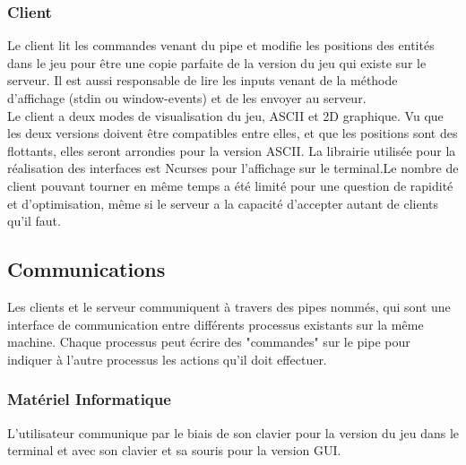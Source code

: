 \documentclass[french]{article}
\begin{document}
\subsubsection{Client} 
Le client lit les commandes venant du pipe et modifie les positions des entités dans le jeu pour être une copie parfaite de la version du jeu qui existe sur le serveur. Il est aussi responsable de lire les inputs venant de la méthode d'affichage (stdin ou window-events) et de les envoyer au serveur.\\
Le client a deux modes de visualisation du jeu, ASCII et 2D graphique. Vu que les deux versions doivent être compatibles entre elles, et que les positions sont des flottants, elles seront arrondies pour la version ASCII. La librairie utilisée pour la réalisation des interfaces est Ncurses pour l'affichage sur le terminal.Le nombre de client pouvant tourner en même temps a été limité pour une question de rapidité et d'optimisation, même si le serveur a la capacité d'accepter autant de clients qu'il faut.
\subsection{Communications}
Les clients et le serveur communiquent à travers des pipes nommés, qui sont une interface de communication entre différents processus existants sur la même machine. Chaque processus peut écrire des "commandes" sur le pipe pour indiquer à l'autre processus les actions qu'il doit effectuer.
\subsubsection{Matériel Informatique}
L'utilisateur communique par le biais de son clavier pour la version du jeu dans le terminal et avec son clavier et sa souris pour la version GUI.
\end{document}
